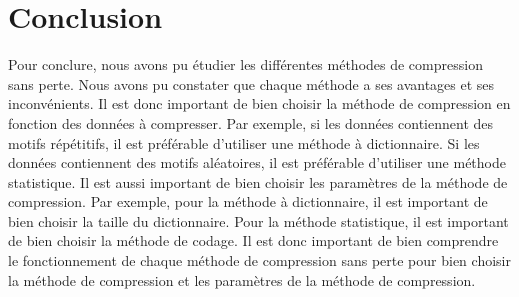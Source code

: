 \section{Conclusion}

Pour conclure, nous avons pu étudier les différentes méthodes de compression sans perte. Nous avons pu constater que chaque méthode a ses avantages et ses inconvénients. Il est donc important de bien choisir la méthode de compression en fonction des données à compresser. Par exemple, si les données contiennent des motifs répétitifs, il est préférable d'utiliser une méthode à dictionnaire. Si les données contiennent des motifs aléatoires, il est préférable d'utiliser une méthode statistique. Il est aussi important de bien choisir les paramètres de la méthode de compression. Par exemple, pour la méthode à dictionnaire, il est important de bien choisir la taille du dictionnaire. Pour la méthode statistique, il est important de bien choisir la méthode de codage. Il est donc important de bien comprendre le fonctionnement de chaque méthode de compression sans perte pour bien choisir la méthode de compression et les paramètres de la méthode de compression.